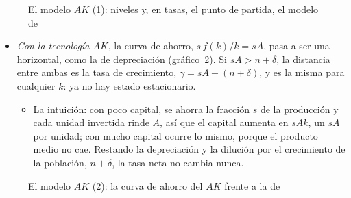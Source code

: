 \documentclass[11pt]{article}
\begin{document}
\begin{figure}[H]
\centering
\caption{El modelo $AK$ (1): niveles y, en tasas, el punto de partida, el modelo de }\label{fig:tasas-endogeno-1}
\end{figure}

\begin{itemize}
\item \emph{Con la tecnología $AK$}, la curva de ahorro, $s\,f(k)/k=sA$, pasa a ser una horizontal, como la de depreciación (gráfico~\ref{fig:tasas-endogeno-2}). Si $sA>n+\delta$, la distancia entre ambas es la tasa de crecimiento, $\gamma=sA-(n+\delta)$, y es la misma para cualquier $k$: ya no hay estado estacionario.
  \begin{itemize}
  \item La intuición: con poco capital, se ahorra la fracción $s$ de la producción y cada unidad invertida rinde $A$, así que el capital aumenta en $sAk$, un $sA$ por unidad; con mucho capital ocurre lo mismo, porque el producto medio no cae. Restando la depreciación y la dilución por el crecimiento de la población, $n+\delta$, la tasa neta no cambia nunca.
  \end{itemize}
\end{itemize}

\begin{figure}[H]
\centering
\caption{El modelo $AK$ (2): la curva de ahorro del $AK$ frente a la de }\label{fig:tasas-endogeno-2}
\end{figure}
\end{document}
